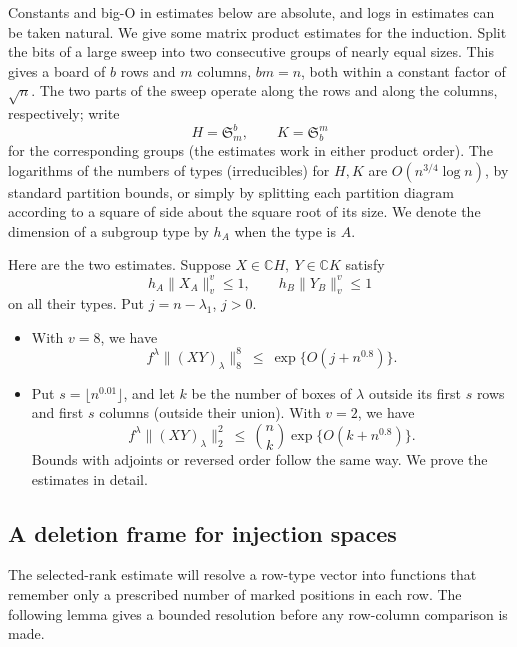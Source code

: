 Constants and big-O in estimates below are absolute, and logs in estimates can be taken natural. We give some matrix product estimates for the induction. Split the bits of a large sweep into two consecutive groups of nearly equal sizes. This gives a board of \(b\) rows and \(m\) columns, \(bm=n\), both within a constant factor of \(\sqrt n\). The two parts of the sweep operate along the rows and along the columns, respectively; write
\[
 H=\mathfrak S_m^b,\qquad K=\mathfrak S_b^m
\]
for the corresponding groups (the estimates work in either product order). The logarithms of the numbers of types (irreducibles) for \(H,K\) are \(O(n^{3/4}\log n)\), by standard partition bounds, or simply by splitting each partition diagram according to a square of side about the square root of its size. We denote the dimension of a subgroup type by \(h_A\) when the type is \(A\).

Here are the two estimates. Suppose \(X\in\mathbb C H,\ Y\in\mathbb C K\) satisfy
\begin{equation}
 h_A\|X_A\|_v^v\le 1,\qquad h_B\|Y_B\|_v^v\le 1
 \label{ten:frames:eq:3}
\end{equation}
on all their types. Put \(j=n-\lambda_1\), \(j>0\).

\begin{itemize}
\item With \(v=8\), we have
\begin{equation}
 f^\lambda\|(XY)_\lambda\|_8^8 \ \le\ \exp\{O(j+n^{0.8})\}.
 \label{ten:frames:eq:4}
\end{equation}
\item Put \(s=\lfloor n^{0.01}\rfloor\), and let \(k\) be the number of boxes of \(\lambda\) outside its first \(s\) rows and first \(s\) columns (outside their union). With \(v=2\), we have
\begin{equation}
 f^\lambda\|(XY)_\lambda\|_2^2
 \ \le\ \binom nk \exp\{O(k+n^{0.8})\}.
 \label{ten:frames:eq:5}
\end{equation}
Bounds with adjoints or reversed order follow the same way. We prove the estimates in detail.
\end{itemize}

\subsection{A deletion frame for injection spaces}
\label{ten:frames:part:57}
The selected-rank estimate will resolve a row-type vector into functions that remember only a prescribed number of marked positions in each row. The following lemma gives a bounded resolution before any row-column comparison is made.

